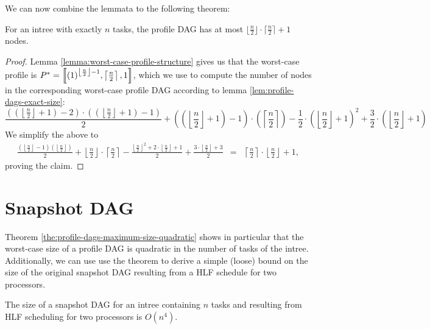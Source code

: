We can now combine the lemmata to the following theorem:

\begin{theorem}
  \label{the:profile-dags-maximum-size-quadratic}
  For an intree with exactly $n$ tasks, the profile DAG has at most $\lfloor \frac{n}{2} \rfloor \cdot \lceil \frac{n}{2} \rceil +1$ nodes.
\end{theorem}

\begin{proof}
  Lemma \ref{lemma:worst-case-profile-structure} gives us that the worst-case profile is $P^*=\left\llbracket  {(1)}^{ \left\lfloor\frac{n}{2} \right\rfloor - 1}, \left\lceil \frac{n}{2} \right\rceil, 1  \right\rrbracket$, which we use to compute the number of nodes in the corresponding worst-case profile DAG according to lemma \ref{lem:profile-dags-exact-size}:
  \renewcommand{\r}{\left(\left\lfloor\frac{n}{2}\right\rfloor + 1\right)}
  \begin{equation*}
    \frac{(\r-2)\cdot(\r-1)}{2} + 
    \left(\r-1\right)\cdot\left( \left\lceil \frac{n}{2} \right\rceil \right)
    - \frac{1}{2} \cdot \r^2 + \frac{3}{2} \cdot \r     
  \end{equation*}
  We simplify the above to
  \newcommand{\ceiln}{\left\lceil \frac{n}{2} \right\rceil}
  \newcommand{\floorn}{\left\lfloor \frac{n}{2} \right\rfloor}
  \begin{eqnarray*}
    \frac{\left( \floorn -1 \right)\left( \floorn \right)}{2}
    + \floorn \cdot \ceiln
    - \frac{\floorn^2 + 2\cdot \floorn + 1}{2}
    + \frac{3\cdot \floorn + 3}{2}
    & = &
    \ceiln \cdot \floorn + 1,
  \end{eqnarray*}
  proving the claim.
\end{proof}

\section{Snapshot DAG}
\label{sec:p2-snapshot-dag}

Theorem \ref{the:profile-dags-maximum-size-quadratic} shows in particular that the worst-case size of a profile DAG is quadratic in the number of tasks of the intree. Additionally, we can use use the theorem to derive a simple (loose) bound on the size of the original snapshot DAG resulting from a HLF schedule for two processors.

\begin{corollary}
  The size of a snapshot DAG for an intree containing $n$ tasks and resulting from HLF scheduling for two processors is $O(n^4)$.
\end{corollary}

